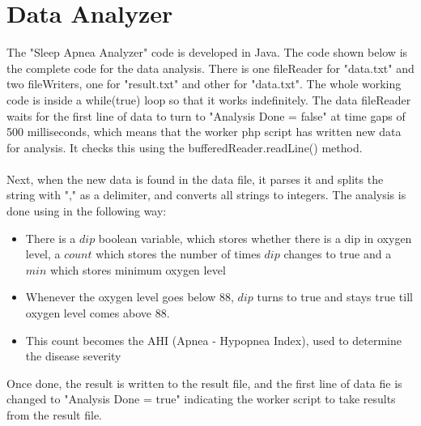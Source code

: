\documentclass{article}
\begin{document}
\section{Data Analyzer}
The "Sleep Apnea Analyzer" code is developed in Java. The code shown below is the complete code for the data analysis. There is one fileReader for "data.txt" and two fileWriters, one for "result.txt" and other for "data.txt". The whole working code is inside a while(true) loop so that it works indefinitely. The data fileReader waits for the first line of data to turn to "Analysis Done = false" at time gaps of 500 milliseconds, which means that the worker php script has written new data for analysis. It checks this using the bufferedReader.readLine() method. \\ \\
Next, when the new data is found in the data file, it parses it and splits the string with "," as a delimiter, and converts all strings to integers. The analysis is done using in the following way:
\begin{itemize}
\item There is a $dip$ boolean variable, which stores whether there is a dip in oxygen level, a $count$ which stores the number of times $dip$ changes to true and a $min$ which stores minimum oxygen level
\item Whenever the oxygen level goes below 88, $dip$ turns to true and stays true till oxygen level comes above 88.
\item This count becomes the AHI (Apnea - Hypopnea Index), used to determine the disease severity
\end{itemize}
Once done, the result is written to the result file, and the first line of data fie is changed to "Analysis Done = true" indicating the worker script to take results from the result file.\\
\end{document}

